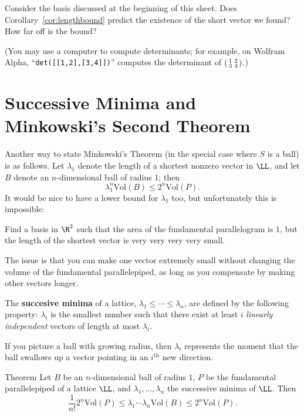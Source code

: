 \begin{explor}
	Consider the basis discussed at the beginning of this sheet. Does Corollary~\ref{cor:lengthbound} predict the existence of the short vector we found? How far off is the bound?
	
	\color{DarkGreen}(You may use a computer to compute determinants; for example, on Wolfram Alpha, ``\texttt{det([[1,2],[3,4]])}'' computes the determinant of $\begin{psmallmatrix}
	1&2\\3&4
	\end{psmallmatrix}$.)
\end{explor}

\pagebreak

\section*{Successive Minima and Minkowski's Second Theorem}

Another way to state Minkowski's Theorem (in the special case where $S$ is a ball) is as follows. Let $\lambda_1$ denote the length of a shortest nonzero vector in $\LL$, and let $B$ denote an $n$-dimensional ball of radius $1$; then
\[\lambda_1^n\text{Vol}(B)\leq 2^n\text{Vol}(P).\]
It would be nice to have a lower bound for $\lambda_1$ too, but unfortunately this is impossible:
\begin{explor}
	Find a basis in $\R^2$ such that the area of the fundamental parallelogram is $1$, but the length of the shortest vector is very very very very small.
\end{explor}
The issue is that you can make one vector extremely small without changing the volume of the fundamental parallelepiped, as long as you compensate by making other vectors longer.

\begin{defn}
The \textbf{succesive minima} of a lattice, $\lambda_1\leq\cdots\leq\lambda_n$, are defined by the following property: $\lambda_i$ is the smallest number such that there exist at least $i$ \emph{linearly independent} vectors of length at most $\lambda_i$. 
\end{defn}
If you picture a ball with growing radius, then $\lambda_i$ represents the moment that the ball swallows up a vector pointing in an $i^\text{th}$ new direction.
\begin{toprove}{Theorem}\label{thm:minkowski2}
	Let $B$ be an $n$-dimensional ball of radius $1$, $P$ be the fundamental parallelepiped of a lattice $\LL$, and $\lambda_1,\ldots,\lambda_n$ the successive minima of $\LL$. Then
	\[\frac{1}{n!}2^n\text{Vol}(P)\leq \lambda_1\cdots\lambda_n\text{Vol}(B)\leq 2^n\text{Vol}(P).\]
\end{toprove}

